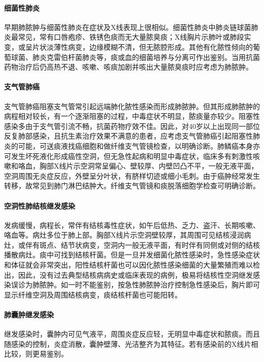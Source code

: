 \paragraph{细菌性肺炎}

早期肺脓肿与细菌性肺炎在症状及X线表现上很相似。细菌性肺炎中肺炎链球菌肺炎最常见，常有口唇疱疹、铁锈色痰而无大量脓臭痰；X线胸片示肺叶或肺段实变，或呈片状淡薄性病变，边缘模糊不清，但无脓腔形成。其他有化脓性倾向的葡萄球菌、肺炎克雷伯杆菌肺炎等，痰或血的细菌培养与分离可作出鉴别。当用抗菌药物治疗后仍高热不退、咳嗽、咳痰加剧并咳出大量脓臭痰时应考虑为肺脓肿。

\paragraph{支气管肺癌}

支气管肺癌阻塞支气管常引起远端肺化脓性感染而形成肺脓肿。但其形成肺脓肿的病程相对较长，有一个逐渐阻塞的过程，中毒症状不明显，脓痰量亦较少。阻塞性感染多由于支气管引流不畅，抗菌药物疗效不佳。因此，对40岁以上出现同一部位反复肺部感染，且抗生素治疗效果不满意的患者，应考虑支气管肺癌引起阻塞性肺炎的可能，可送痰液找癌细胞和做纤维支气管镜检查，以明确诊断。肺鳞癌本身亦可发生坏死液化形成癌性空洞，但无急性起病和明显中毒症状，临床多有刺激性咳嗽和咯血，胸部X线片示空洞常呈偏心、壁较厚、内壁凹凸不平，一般无液平面，空洞周围无炎症反应，外壁呈分叶状，有脐样切迹或细小毛刺。由于癌肿经常发生转移，故常见到肺门淋巴结肿大。纤维支气管镜和痰脱落细胞学检查可明确诊断。

\paragraph{空洞性肺结核继发感染}

发病缓慢，病程长，常伴有结核毒性症状，如午后低热、乏力、盗汗、长期咳嗽、咯血等。病灶多位于肺上部。胸部X线片示空洞壁较厚，其周围可见结核浸润病灶，或伴有斑点、结节状病变，空洞内一般无液平面，有时伴有同侧或对侧的结核播散病灶。痰中可找到结核杆菌。但是一旦并发细菌化脓性感染时，急性感染症状和体征就会非常突出，阳性结核杆菌也可以因化脓性感染细菌的大量繁殖而难以检出，因此，没有过去典型结核病病史或临床表现的病例，极易将结核性空洞继发感染误诊为肺脓肿。如一时不能鉴别，按急性肺脓肿治疗控制急性感染后，胸片即可显示纤维空洞及周围结核病变，痰结核杆菌也可能阳转。

\paragraph{肺囊肿继发感染}

继发感染时，囊肿内可见气液平，周围炎症反应轻，无明显中毒症状和脓痰。而且随感染的控制，炎症消散，囊肿壁薄、光洁整齐为其特征。若有感染前的X线片相比较，则更易鉴别。

